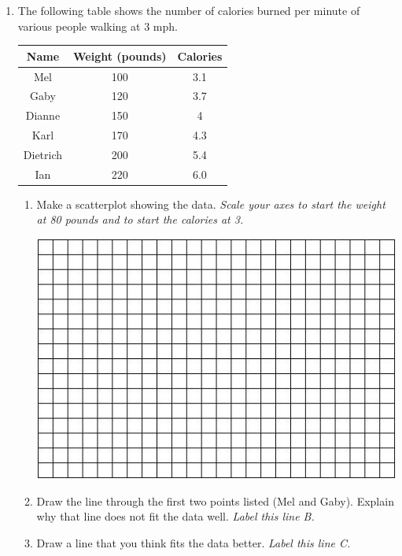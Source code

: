 \documentclass[12pt]{article}
\begin{document}
\begin{enumerate}
\item The following table shows the number of calories burned per minute of various people walking at 3 mph.

\begin{center}
\begin{tabular} { | c | c | c |} \hline
Name & Weight  (pounds) & Calories \\ \hline \hline
Mel & 100 & 3.1  \\ \hline
Gaby & 120 & 3.7  \\ \hline
Dianne & 150 & 4 \\ \hline
Karl & 170 & 4.3 \\  \hline
Dietrich & 200 & 5.4 \\ \hline
Ian & 220 & 6.0 \\ \hline
\end{tabular}
\end{center}

\begin{enumerate}
\item Make a scatterplot showing the data.  \emph{Scale your axes to start the  weight at 80 pounds and to start the calories at 3.}
\vfill
\begin{center}
 {\includegraphics [width = 6in] {../GraphPaper}}
\end{center}
\vfill

\item  Draw the line through the first two points listed (Mel and Gaby).  Explain why that line does not fit the data well.  \emph{Label this line B.}
\vfill
\vfill
\vfill
\item  Draw a line that you think fits the data better.  \emph{Label this line C.}
\end{enumerate}


\end{enumerate}
\end{document}
